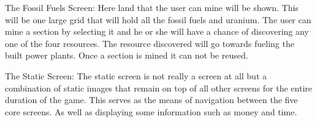 \documentclass[msc,oneside]{ubcthesis}%
\begin{document}
\noindent The Fossil Fuels Screen: \newline
\indent Here land that the user can mine will be shown. This will be one large grid that will hold all the 
fossil fuels and uranium. The user can mine a section by selecting it and he or she will have a chance 
of discovering any one of the four resources. The resource discovered will go towards fueling the built 
power plants. Once a section is mined it can not be reused. 
\bigskip

\noindent The Static Screen: \newline
\indent The static screen is not really a screen at all but a combination of static images that remain on 
top of all other screens for the entire duration of the game. This serves as the means of navigation 	
between the five core screens. As well as displaying some information such as money and time. 
\bigskip






\end{document}
